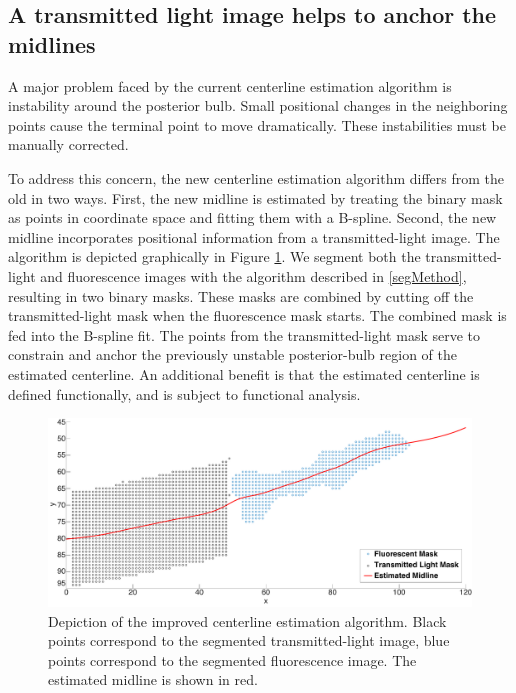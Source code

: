 \subsection{A transmitted light image helps to anchor the midlines} \label{TLMidlines}
A major problem faced by the current centerline estimation algorithm is instability around the posterior bulb. Small positional changes in the neighboring points cause the terminal point to move dramatically. These instabilities must be manually corrected.

To address this concern, the new centerline estimation algorithm differs from the old in two ways. First, the new midline is estimated by treating the binary mask as points in coordinate space and  fitting them with a B-spline.  Second, the new midline incorporates positional information from a transmitted-light image. The algorithm is depicted graphically in Figure \ref{fig:midlineFit}. We segment both the transmitted-light and fluorescence images with the algorithm described in \ref{segMethod}, resulting in two binary masks. These masks are combined by cutting off the transmitted-light mask when the fluorescence mask starts. The combined mask is fed into the B-spline fit. The points from the transmitted-light mask serve to constrain and anchor the previously unstable posterior-bulb region of the estimated centerline. An additional benefit is that the estimated centerline is defined functionally, and is subject to functional analysis.

\begin{figure}[ht]
    \centering
    \includegraphics[scale=.25]{Figures/rendered_files/midline_fit}
    \decoRule
    \caption[Improved centerline estimation algorithm]{Depiction of the improved centerline estimation algorithm. Black points correspond to the segmented transmitted-light image, blue points correspond to the segmented fluorescence image. The estimated midline is shown in red.}
    \label{fig:midlineFit}
\end{figure}


